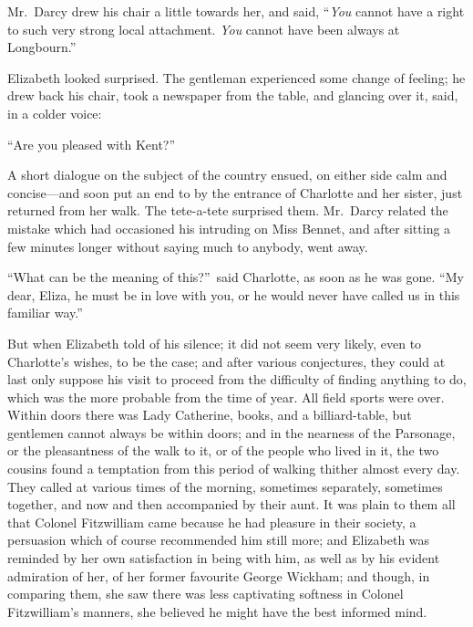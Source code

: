 \documentclass[12pt,english,oneside]{book}
\begin{document}
Mr.\ Darcy drew his chair a little towards her, and said, {}``\textit{You}
cannot have a right to such very strong local attachment. \textit{You}
cannot have been always at Longbourn.''

Elizabeth looked surprised. The gentleman experienced some change
of feeling; he drew back his chair, took a newspaper from the table,
and glancing over it, said, in a colder voice:

{}``Are you pleased with Kent?''\ 

A short dialogue on the subject of the country ensued, on either side
calm and concise\mbox{---}and soon put an end to by the entrance
of Charlotte and her sister, just returned from her walk. The tete-a-tete
surprised them. Mr.\ Darcy related the mistake which had occasioned
his intruding on Miss Bennet, and after sitting a few minutes longer
without saying much to anybody, went away.

{}``What can be the meaning of this?''\ said Charlotte, as soon
as he was gone. {}``My dear, Eliza, he must be in love with you,
or he would never have called us in this familiar way.''

But when Elizabeth told of his silence; it did not seem very likely,
even to Charlotte's wishes, to be the case; and after various conjectures,
they could at last only suppose his visit to proceed from the difficulty
of finding anything to do, which was the more probable from the time
of year. All field sports were over. Within doors there was Lady Catherine,
books, and a billiard-table, but gentlemen cannot always be within
doors; and in the nearness of the Parsonage, or the pleasantness of
the walk to it, or of the people who lived in it, the two cousins
found a temptation from this period of walking thither almost every
day. They called at various times of the morning, sometimes separately,
sometimes together, and now and then accompanied by their aunt. It
was plain to them all that Colonel Fitzwilliam came because he had
pleasure in their society, a persuasion which of course recommended
him still more; and Elizabeth was reminded by her own satisfaction
in being with him, as well as by his evident admiration of her, of
her former favourite George Wickham; and though, in comparing them,
she saw there was less captivating softness in Colonel Fitzwilliam's
manners, she believed he might have the best informed mind.
\end{document}
